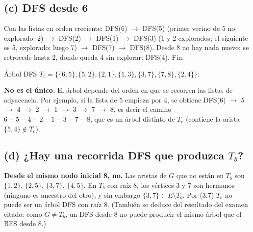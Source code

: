 \subsection*{(c) DFS desde 6}
Con las listas en orden creciente: \textsc{DFS}(6) $\to$ \textsc{DFS}(5) (primer vecino de 5 no
explorado: 2) $\to$ \textsc{DFS}(2) $\to$ \textsc{DFS}(1) $\to$ \textsc{DFS}(3) (1 y 2 explorados; el
siguiente es 5, explorado; luego 7) $\to$ \textsc{DFS}(7) $\to$ \textsc{DFS}(8). Desde 8 no hay
nada nuevo; se retrocede hasta 2, donde queda 4 sin explorar: \textsc{DFS}(4). Fin.

Árbol DFS $T_c=\{\{6,5\},\{5,2\},\{2,1\},\{1,3\},\{3,7\},\{7,8\},\{2,4\}\}$:
\begin{center}
\end{center}
\textbf{No es el único.} El árbol depende del orden en que se recorren las listas de adyacencia.
Por ejemplo, si la lista de 5 empieza por 4, se obtiene \textsc{DFS}(6) $\to$ 5 $\to$ 4 $\to$ 2
$\to$ 1 $\to$ 3 $\to$ 7 $\to$ 8, es decir el camino $6-5-4-2-1-3-7-8$, que es un árbol distinto
de $T_c$ (contiene la arista $\{5,4\}\notin T_c$).

\subsection*{(d) ¿Hay una recorrida DFS que produzca $T_b$?}
\textbf{Desde el mismo nodo inicial 8, no.} Las aristas de $G$ que no están en $T_b$ son
$\{1,2\}$, $\{2,5\}$, $\{3,7\}$, $\{4,5\}$. En $T_b$ con raíz 8, los vértices 3 y 7 son hermanos (ninguno es
ancestro del otro), y sin embargo $\{3,7\}\in E\setminus T_b$. Por (3.7) $T_b$ no puede ser un árbol
DFS con raíz 8. (También se deduce del resultado del examen citado: como $G\neq T_b$, un DFS desde 8
no puede producir el mismo árbol que el BFS desde 8.)

